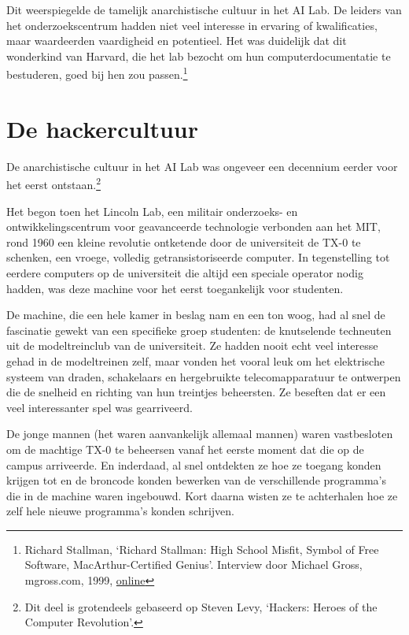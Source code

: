 \documentclass[smalldemyvopaper,11pt,twoside,onecolumn,openright,extrafontsizes,hidelinks]{memoir}
\begin{document}
Dit weerspiegelde de tamelijk anarchistische cultuur in het AI Lab. De
leiders van het onderzoekscentrum hadden niet veel interesse in ervaring
of kwalificaties, maar waardeerden vaardigheid en potentieel. Het was
duidelijk dat dit wonderkind van Harvard, die het lab bezocht om hun
computerdocumentatie te bestuderen, goed bij hen zou passen.\footnote{Richard
  Stallman, `Richard Stallman: High School Misfit, Symbol of Free
  Software, MacArthur-Certified Genius'. Interview door Michael Gross,
  mgross.com, 1999,
  \href{https://www.mgross.com/writing/books/my-generation/bonus-chapters/richard-stallman-high-school-misfit-symbol-of-free-software-macarthur-certified-genius/.}{online}}

\section{De hackercultuur}\label{de-hackercultuur}

De anarchistische cultuur in het AI Lab was ongeveer een decennium
eerder voor het eerst ontstaan.\footnote{Dit deel is grotendeels
  gebaseerd op Steven Levy, `Hackers: Heroes of the Computer
  Revolution'.}

Het begon toen het Lincoln Lab, een militair onderzoeks- en
ontwikkelingscentrum voor geavanceerde technologie verbonden aan het
MIT, rond 1960 een kleine revolutie ontketende door de universiteit de
TX-0 te schenken, een vroege, volledig getransistoriseerde computer. In
tegenstelling tot eerdere computers op de universiteit die altijd een
speciale operator nodig hadden, was deze machine voor het eerst
toegankelijk voor studenten.

De machine, die een hele kamer in beslag nam en een ton woog, had al
snel de fascinatie gewekt van een specifieke groep studenten: de
knutselende techneuten uit de modeltreinclub van de universiteit. Ze
hadden nooit echt veel interesse gehad in de modeltreinen zelf, maar
vonden het vooral leuk om het elektrische systeem van draden,
schakelaars en hergebruikte telecomapparatuur te ontwerpen die de
snelheid en richting van hun treintjes beheersten. Ze beseften dat er
een veel interessanter spel was gearriveerd.

De jonge mannen (het waren aanvankelijk allemaal mannen) waren
vastbesloten om de machtige TX-0 te beheersen vanaf het eerste moment
dat die op de campus arriveerde. En inderdaad, al snel ontdekten ze hoe
ze toegang konden krijgen tot en de broncode konden bewerken van de
verschillende programma's die in de machine waren ingebouwd. Kort daarna
wisten ze te achterhalen hoe ze zelf hele nieuwe programma's konden
schrijven.
\end{document}
